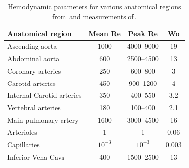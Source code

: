 \begin{table}[htb]
	\centering
	\renewcommand{\arraystretch}{1.2}
	\setlength{\tabcolsep}{4pt}
	\small
	\begin{tabular}{l c c c}
		\toprule
		\textbf{Anatomical region} & \textbf{Mean Re} & \textbf{Peak Re} & \textbf{Wo} \\
		\midrule
		Ascending aorta            & 1000             & 4000--9000       & 19          \\
		Abdominal aorta            & 600              & 2500--4500       & 13          \\
		Coronary arteries          & 250              & 600--800         & 3           \\
		Carotid arteries           & 450              & 900--1200        & 4           \\
		Internal Carotid arteries  & 350              & 400--550         & 3.2         \\
		Vertebral arteries         & 180              & 100--400         & 2.1         \\
		Main pulmonary artery      & 1600             & 3000--4500       & 16          \\
		Arterioles                 & 1                & 1                & 0.06        \\
		Capillaries                & $10^{-3}$        & $10^{-3}$        & 0.003       \\
		Inferior Vena Cava         & 400              & 1500--2500       & 13          \\
		\bottomrule
	\end{tabular}
	\caption[Reynolds and Womersley numbers in human vessels]{Hemodynamic parameters for various anatomical regions from\,\cite{Menon2024} and measurements of\,\cite{Cebral2009_data}.}\label{table:hemodynamics}
\end{table}


